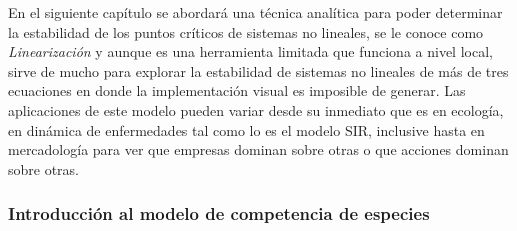 En el siguiente capítulo se abordará una técnica analítica para poder determinar la estabilidad de los puntos críticos de sistemas no lineales, se le conoce como \textit{Linearización} y aunque es una herramienta limitada que funciona a nivel local, sirve de mucho para explorar la estabilidad de sistemas no lineales de más de tres ecuaciones en donde la implementación visual es imposible de generar. Las aplicaciones de este modelo pueden variar desde su inmediato que es en ecología, en dinámica de enfermedades tal como lo es el modelo SIR, inclusive hasta en mercadología para ver que empresas dominan sobre otras o que acciones dominan sobre otras.

\subsubsection{Introducción al modelo de competencia de especies}

